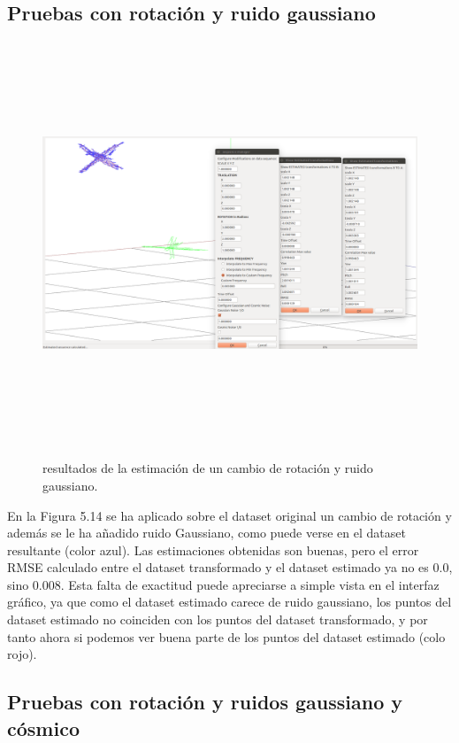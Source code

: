 \subsection{Pruebas con rotación y ruido gaussiano}
\begin{figure}[h]
\begin{center}
\label{fig:opciones de View}\includegraphics[height=12.0cm,width=18.0cm]{img/cap6/Rota_GaussNoise_abba.png}
\hspace{0.5cm}

\end{center}

\caption{ resultados de la estimación de un cambio de rotación y ruido gaussiano.}
\end{figure}
En la Figura 5.14 se ha aplicado sobre el dataset original un cambio de rotación y además se le ha añadido ruido Gaussiano, como puede verse en el dataset resultante (color azul). Las estimaciones obtenidas son buenas, pero el error RMSE calculado entre el dataset transformado y el dataset estimado ya no es 0.0, sino 0.008. Esta falta de exactitud puede apreciarse a simple vista en el interfaz gráfico, ya que como el dataset estimado carece de ruido gaussiano, los puntos del dataset estimado no coinciden con los puntos del dataset transformado, y por tanto ahora si podemos ver buena parte de los puntos del dataset estimado (colo rojo).


\subsection{Pruebas con rotación y ruidos gaussiano y cósmico}

